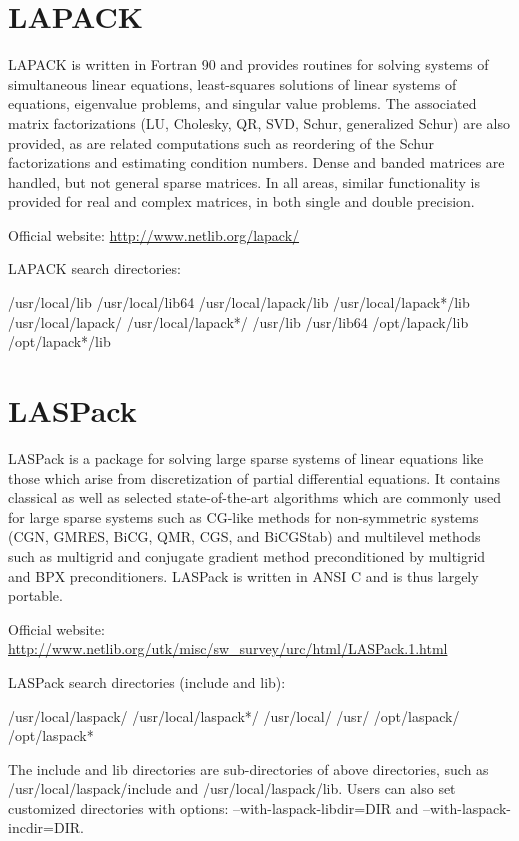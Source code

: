 \documentclass[12pt]{book}
\begin{document}
\section{LAPACK}
LAPACK is written in Fortran 90 and provides routines for solving systems of simultaneous linear equations, least-squares solutions of linear systems of equations, eigenvalue problems, and singular value problems. The associated matrix factorizations (LU, Cholesky, QR, SVD, Schur, generalized Schur) are also provided, as are related computations such as reordering of the Schur factorizations and estimating condition numbers. Dense and banded matrices are handled, but not general sparse matrices. In all areas, similar functionality is provided for real and complex matrices, in both single and double precision.

Official website: \url{http://www.netlib.org/lapack/}

LAPACK search directories:
\begin{evb}
/usr/local/lib
/usr/local/lib64
/usr/local/lapack/lib
/usr/local/lapack*/lib
/usr/local/lapack/
/usr/local/lapack*/
/usr/lib
/usr/lib64
/opt/lapack/lib
/opt/lapack*/lib
\end{evb}

\section{LASPack}
LASPack is a package for solving large sparse systems of linear equations like those which arise from discretization of partial differential equations.  It contains classical as well as selected state-of-the-art algorithms which are commonly used for large sparse systems such as CG-like methods for non-symmetric systems (CGN, GMRES, BiCG, QMR, CGS, and BiCGStab) and multilevel methods such as multigrid and conjugate gradient method preconditioned by multigrid and BPX preconditioners.  LASPack is written in ANSI C and is thus largely portable.  

Official website: {\small \url{http://www.netlib.org/utk/misc/sw_survey/urc/html/LASPack.1.html}}

LASPack search directories (include and lib):
\begin{evb}
/usr/local/laspack/
/usr/local/laspack*/
/usr/local/
/usr/
/opt/laspack/
/opt/laspack*
\end{evb}
The include and lib directories are sub-directories of above directories, such as /usr/local/laspack/include and /usr/local/laspack/lib. Users can also set customized directories with options: --with-laspack-libdir=DIR and --with-laspack-incdir=DIR.
\end{document}
